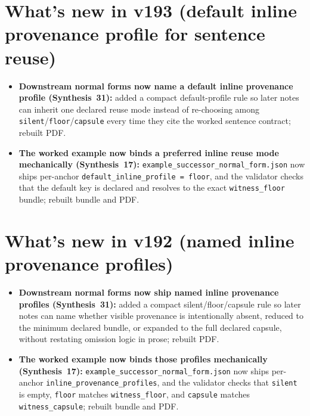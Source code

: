 \documentclass[11pt]{article}
\begin{document}
\section{What's new in v193 (default inline provenance profile for sentence reuse)}
\begin{itemize}[leftmargin=*]
\item \textbf{Downstream normal forms now name a default inline provenance profile (Synthesis~31):} added a compact default-profile rule so later notes can inherit one declared reuse mode instead of re-choosing among \texttt{silent}/\texttt{floor}/\texttt{capsule} every time they cite the worked sentence contract; rebuilt PDF.
\item \textbf{The worked example now binds a preferred inline reuse mode mechanically (Synthesis~17):} \texttt{example\_successor\_normal\_form.json} now ships per-anchor \texttt{default\_inline\_profile = floor}, and the validator checks that the default key is declared and resolves to the exact \texttt{witness\_floor} bundle; rebuilt bundle and PDF.
\end{itemize}


\section{What's new in v192 (named inline provenance profiles)}
\begin{itemize}[leftmargin=*]
\item \textbf{Downstream normal forms now ship named inline provenance profiles (Synthesis~31):} added a compact silent/floor/capsule rule so later notes can name whether visible provenance is intentionally absent, reduced to the minimum declared bundle, or expanded to the full declared capsule, without restating omission logic in prose; rebuilt PDF.
\item \textbf{The worked example now binds those profiles mechanically (Synthesis~17):} \texttt{example\_successor\_normal\_form.json} now ships per-anchor \texttt{inline\_provenance\_profiles}, and the validator checks that \texttt{silent} is empty, \texttt{floor} matches \texttt{witness\_floor}, and \texttt{capsule} matches \texttt{witness\_capsule}; rebuilt bundle and PDF.
\end{itemize}
\end{document}
